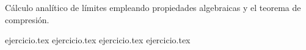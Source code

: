 
Cálculo analítico de límites empleando propiedades algebraicas y el teorema de compresión.

\begin{enumerate}
    {ejercicio.tex}
    \setcounter{enumi}{3}
    {ejercicio.tex}
    \setcounter{enumi}{8}
    {ejercicio.tex}
    \setcounter{enumi}{16}
    {ejercicio.tex}
\end{enumerate}
